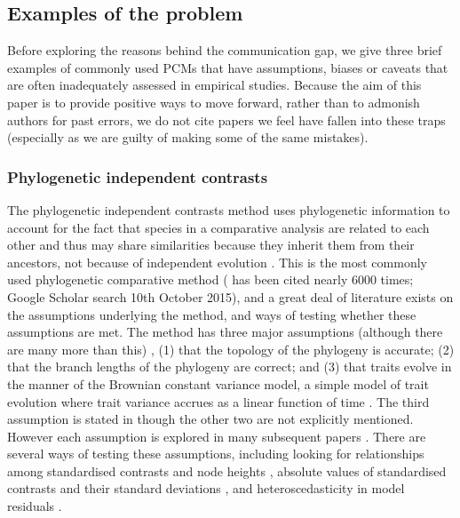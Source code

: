 \documentclass[a4paper,12pt]{article}
\begin{document}
\subsection{Examples of the problem}
Before exploring the reasons behind the communication gap, we give three brief examples of commonly used PCMs that have assumptions, biases or caveats that are often inadequately assessed in empirical studies.
Because the aim of this paper is to provide positive ways to move forward, rather than to admonish authors for past errors, we do not cite papers we feel have fallen into these traps (especially as we are guilty of making some of the same mistakes). 

\subsubsection{Phylogenetic independent contrasts}
The phylogenetic independent contrasts method uses phylogenetic information to account for the fact that species in a comparative analysis are related to each other and thus may share similarities because they inherit them from their ancestors, not because of independent evolution \citep{felsenstein1985phylogenies,harvey1991comparative}. 
This is the most commonly used phylogenetic comparative method (\citet{felsenstein1985phylogenies} has been cited nearly 6000 times; Google Scholar search 10th October 2015), and a great deal of literature exists on the assumptions underlying the method, and ways of testing whether these assumptions are met. 
The method has three major assumptions (although there are many more than this) \citep{diaz1996testing}, (1) that the topology of the phylogeny is accurate; (2) that the branch lengths of the phylogeny are correct; and (3) that traits evolve in the manner of the Brownian constant variance model, a simple model of trait evolution where trait variance accrues as a linear function of time \citep{cavalli1967,felsenstein1973maximum}.
The third assumption is stated in \citet{felsenstein1985phylogenies} though the other two are not explicitly mentioned. 
However each assumption is explored in many subsequent papers \citep[e.g.][]{felsenstein1988phylogenies,grafen1989phylogenetic,harvey1991comparative,garland1992procedures,purvis1995comparative,diaz1996testing,hansen1996translating,martins1997phylogenies,freckleton2000phylogenetic,garland2000using,hansen2005assessing,freckleton2006detecting,rohle2006comment}.
There are several ways of testing these assumptions, including looking for relationships among standardised contrasts and node heights \citep{grafen1989phylogenetic,freckleton2006detecting}, absolute values of standardised contrasts and their standard deviations \citep{garland1992procedures,diaz1996testing}, and heteroscedasticity in model residuals \citep{purvis1995mammal}.
\end{document}
